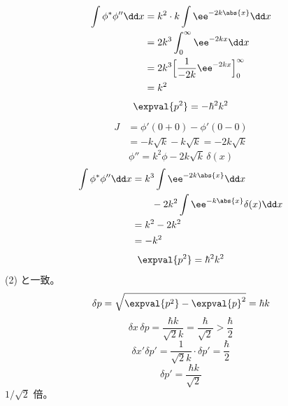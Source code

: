 \begin{align*}
\int\phi^{*}\phi''\dd x&=k^{2}\cdot k\int\ee^{-2k\abs{x}}\dd x\\
&=2k^{3}\int_{0}^{\infty}\ee^{-2kx}\dd x\\
&=2k^{3}\Bigl[\frac{1}{-2k}\ee^{-2kx}\Bigr]_{0}^{\infty}\\
&=k^{2}
\end{align*}
\[ \expval{p^{2}}=-\hbar^{2}k^{2} \]
\begin{align*}
J&=\phi'(0+0)-\phi'(0-0)\\
&=-k\sqrt{k}-k\sqrt{k}=-2k\sqrt{k}
\end{align*}
\[ \phi''=k^{2}\phi-2k\sqrt{k}\,\delta(x) \]
\begin{align*}
\int\phi^{*}\phi''\dd x&=k^{3}\int\ee^{-2k\abs{x}}\dd x\\
&\qquad-2k^{2}\int\ee^{-k\abs{x}}\delta(x)\dd x\\
&=k^{2}-2k^{2}\\
&=-k^{2}
\end{align*}
\[ \expval{p^{2}}=\hbar^{2}k^{2} \]
(2) と一致。
\[ \delta p=\sqrt{\expval{p^{2}}-\expval{p}^{2}}=\hbar k \]
\[ \delta x\,\delta p=\frac{\hbar k}{\sqrt{2}k}=\frac{\hbar}{\sqrt{2}}>\frac{\hbar}{2} \]
\[ \delta x'\delta p'=\frac{1}{\sqrt{2}k}\cdot\delta p'=\frac{\hbar}{2} \]
\[ \delta p'=\frac{\hbar k}{\sqrt{2}} \]
$1/\sqrt{2}$ 倍。
